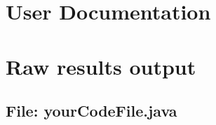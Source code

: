 \documentclass[11pt,openright,a4paper]{report}
\begin{document}
\chapter{User Documentation}

\chapter{Raw results output}


\begin{landscape}
\begin{multicols}{2}
\section{File: yourCodeFile.java}

\end{multicols}
\end{landscape}
\end{document}
